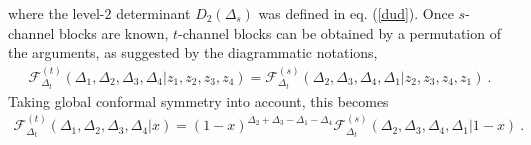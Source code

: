 \documentclass[12pt,a4paper,notitlepage]{report}
\numberwithin{equation}{section}
\theoremstyle{break}
\begin{document}
where the level-$2$ determinant $D_2(\Delta_s)$ was defined in eq. (\ref{dud}). 
Once $s$-channel blocks are known, $t$-channel blocks can be obtained by a permutation of the arguments, as suggested by the diagrammatic notations,
\begin{align}
 \mathcal{F}^{(t)}_{\Delta_t}(\Delta_1,\Delta_2,\Delta_3,\Delta_4|z_1,z_2,z_3,z_4) = \mathcal{F}^{(s)}_{\Delta_t}(\Delta_2,\Delta_3,\Delta_4,\Delta_1|z_2,z_3,z_4,z_1)\ . 
\label{gtgs}
\end{align}
Taking global conformal symmetry into account, this becomes
\begin{align}
 \mathcal{F}^{(t)}_{\Delta_t}(\Delta_1,\Delta_2,\Delta_3,\Delta_4|x) = (1-x)^{\Delta_2+\Delta_3-\Delta_1-\Delta_4}\mathcal{F}^{(s)}_{\Delta_t}(\Delta_2,\Delta_3,\Delta_4,\Delta_1|1-x)\ .
\end{align}
\end{document}
